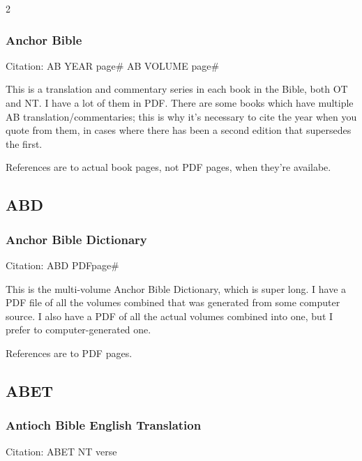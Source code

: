 \begin{multicols}{2}
		\subsubsection*{Anchor Bible}
		
			Citation:
				AB YEAR page\#
				AB VOLUME page\#
		
			This is a translation and commentary series in each book in the Bible, both OT and NT. I have a lot of them in PDF. There are some books which have multiple AB translation/commentaries; this is why it's necessary to cite the year when you quote from them, in cases where there has been a second edition that supersedes the first.
			
			References are to actual book pages, not PDF pages, when they're availabe.
		
	\subsection*{ABD}
	
		\subsubsection*{Anchor Bible Dictionary}
		
			Citation:
				ABD PDFpage\#
		
			This is the multi-volume Anchor Bible Dictionary, which is super long. I have a PDF file of all the volumes combined that was generated from some computer source. I also have a PDF of all the actual volumes combined into one, but I prefer to computer-generated one.
			
			References are to PDF pages.
			
	\subsection*{ABET}
	
		\subsubsection*{Antioch Bible English Translation}
		
			Citation:
				ABET NT verse
		

\end{multicols}
